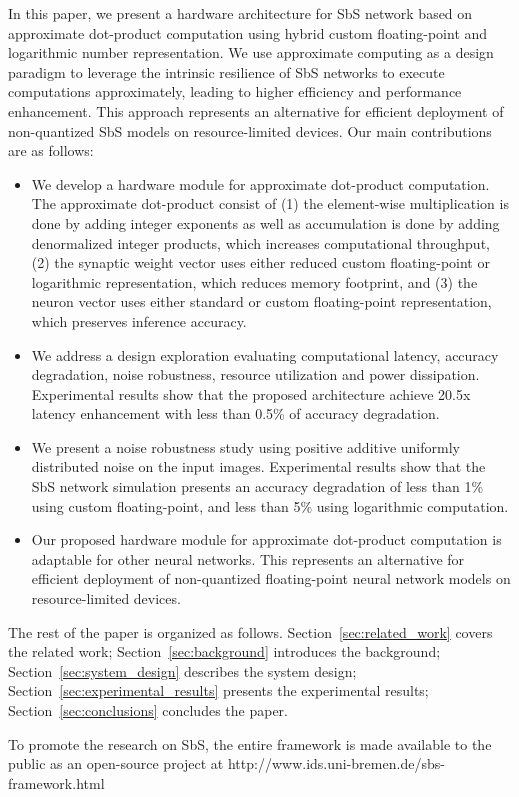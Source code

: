 In this paper, we present a hardware architecture for SbS network based on approximate dot-product computation using hybrid custom floating-point and logarithmic number representation. We use approximate computing as a design paradigm to leverage the intrinsic resilience of SbS networks to execute computations approximately, leading to higher efficiency and performance enhancement. This approach represents an alternative for efficient deployment of non-quantized SbS models on resource-limited devices. Our main contributions are as follows:

\begin{itemize}
	\item We develop a hardware module for approximate dot-product computation. The approximate dot-product consist of (1) the element-wise multiplication is done by adding integer exponents as well as accumulation is done by adding denormalized integer products, which increases computational throughput, (2) the synaptic weight vector uses either reduced custom floating-point or logarithmic representation, which reduces memory footprint, and (3) the neuron vector uses either standard or custom floating-point representation, which preserves inference accuracy.
	\item We address a design exploration evaluating computational latency, accuracy degradation, noise robustness, resource utilization and power dissipation. Experimental results show that the proposed architecture achieve 20.5x latency enhancement with less than 0.5\% of accuracy degradation.
	\item We present a noise robustness study using positive additive uniformly distributed noise on the input images. Experimental results show that the SbS network simulation presents an accuracy degradation of less than 1\% using custom floating-point, and less than 5\% using logarithmic computation.
	\item Our proposed hardware module for approximate dot-product computation is adaptable for other neural networks. This represents an alternative for efficient deployment of non-quantized floating-point neural network models on resource-limited devices.
\end{itemize}


The rest of the paper is organized as follows. Section~\ref{sec:related_work} covers the related work; Section~\ref{sec:background} introduces the background; Section~\ref{sec:system_design} describes the system design; Section~\ref{sec:experimental_results} presents the experimental results; Section~\ref{sec:conclusions} concludes the paper.


To promote the research on SbS, the entire framework is made available to the public as an open-source project at http://www.ids.uni-bremen.de/sbs-framework.html

